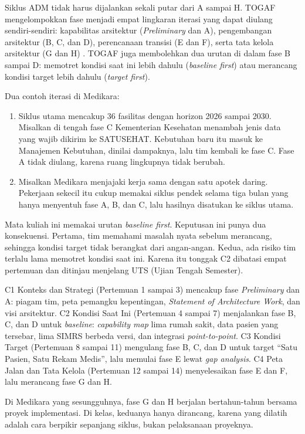 Siklus ADM tidak harus dijalankan sekali putar dari A sampai H. TOGAF
mengelompokkan fase menjadi empat lingkaran iterasi yang dapat diulang
sendiri-sendiri: kapabilitas arsitektur (\textit{Preliminary} dan A),
pengembangan arsitektur (B, C, dan D), perencanaan transisi (E dan F), serta
tata kelola arsitektur (G dan H) \cite{togaf10}. TOGAF juga membolehkan dua
urutan di dalam fase B sampai D: memotret kondisi saat ini lebih dahulu
(\textit{baseline first}) atau merancang kondisi target lebih dahulu
(\textit{target first}).

Dua contoh iterasi di Medikara:

\begin{enumerate}
  \item Siklus utama mencakup 36 fasilitas dengan horizon 2026 sampai 2030.
        Misalkan di tengah fase C Kementerian Kesehatan menambah jenis data
        yang wajib dikirim ke SATUSEHAT. Kebutuhan baru itu masuk ke
        Manajemen Kebutuhan, dinilai dampaknya, lalu tim kembali ke fase C.
        Fase A tidak diulang, karena ruang lingkupnya tidak berubah.
  \item Misalkan Medikara menjajaki kerja sama dengan satu apotek daring.
        Pekerjaan sekecil itu cukup memakai siklus pendek selama tiga bulan
        yang hanya menyentuh fase A, B, dan C, lalu hasilnya disatukan ke
        siklus utama.
\end{enumerate}

Mata kuliah ini memakai urutan \textit{baseline first}. Keputusan ini punya
dua konsekuensi. Pertama, tim memahami masalah nyata sebelum merancang,
sehingga kondisi target tidak berangkat dari angan-angan. Kedua, ada risiko
tim terlalu lama memotret kondisi saat ini. Karena itu tonggak C2 dibatasi
empat pertemuan dan ditinjau menjelang UTS (Ujian Tengah Semester).

\begin{kasus}[title={Kasus Medikara Health: Tonggak Capstone pada Siklus ADM}]
\setlength{\parskip}{0.4em}
C1 Konteks dan Strategi (Pertemuan 1 sampai 3) mencakup fase
\textit{Preliminary} dan A: piagam tim, peta pemangku kepentingan,
\textit{Statement of Architecture Work}, dan visi arsitektur. C2 Kondisi Saat
Ini (Pertemuan 4 sampai 7) menjalankan fase B, C, dan D untuk
\textit{baseline}: \textit{capability map} lima rumah sakit, data pasien yang
tersebar, lima SIMRS berbeda versi, dan integrasi \textit{point-to-point}. C3
Kondisi Target (Pertemuan 8 sampai 11) mengulang fase B, C, dan D untuk
target ``Satu Pasien, Satu Rekam Medis'', lalu memulai fase E lewat
\textit{gap analysis}. C4 Peta Jalan dan Tata Kelola (Pertemuan 12 sampai
14) menyelesaikan fase E dan F, lalu merancang fase G dan H.

Di Medikara yang sesungguhnya, fase G dan H berjalan bertahun-tahun bersama
proyek implementasi. Di kelas, keduanya hanya dirancang, karena yang dilatih
adalah cara berpikir sepanjang siklus, bukan pelaksanaan proyeknya.
\end{kasus}

